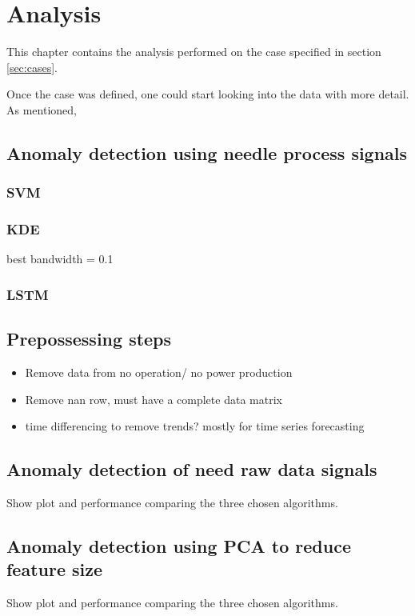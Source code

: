 \chapter{Analysis}\label{cha:analysis}
This chapter contains the analysis performed on the case specified in section \ref{sec:cases}. 


    Once the case was defined, one could start looking into the data with more detail. As mentioned, 
    
    
    \section{Anomaly detection using needle process signals}
        \subsection{SVM}
        
        \subsection{KDE}
            best bandwidth = 0.1
        \subsection{LSTM}
        
    \section{Prepossessing steps}
        \begin{itemize}
            \item Remove data from no operation/ no power production
            \item Remove nan row, must have a complete data matrix 
            \item time differencing to remove trends? mostly for time series forecasting
        \end{itemize}
    \section{Anomaly detection of need raw data signals}
        Show plot and performance comparing the three chosen algorithms. 
    
    \section{Anomaly detection using PCA to reduce feature size}
        Show plot and performance comparing the three chosen algorithms. 
    
